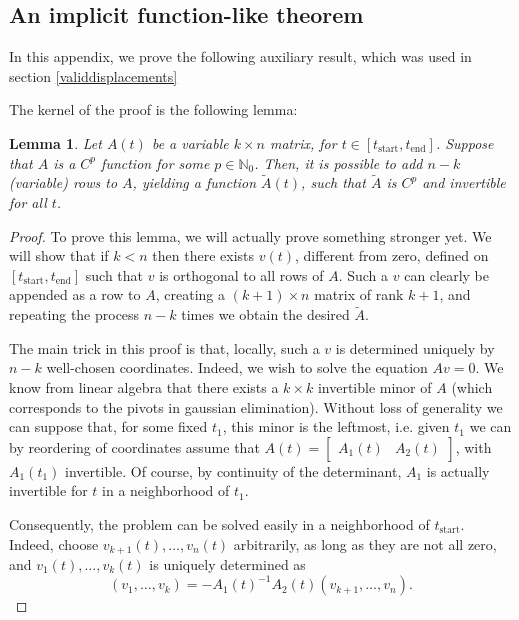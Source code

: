 \documentclass{article}
\theoremstyle{plain}
\newtheorem{lemma}{Lemma}
\theoremstyle{plain}
\theoremstyle{nonumberplain}
\newtheorem{proof}{Proof}
\theoremstyle{empty}
\newcommand{\N}{\mathbb{N}}
\newcommand{\tstart}{\mathrm{start}}
\newcommand{\tend}{\mathrm{end}}
\begin{document}
\begin{appendices}

\section{An implicit function-like theorem}\label{buffift}

In this appendix, we prove the following auxiliary result, which was used in section \ref{validdisplacements}

\buffift*

The kernel of the proof is the following lemma:

\begin{lemma}\label{matrixlemma}
Let $A(t)$ be a variable $k \times n$ matrix, for $t \in [t_\tstart, t_\tend]$. Suppose that $A$ is a $C^p$ function for some $p \in \N_0$. Then, it is possible to add $n-k$ (variable) rows to $A$, yielding a function $\tilde A(t)$, such that $\tilde A$ is $C^p$ and invertible for all $t$.
\end{lemma}

\begin{proof}
To prove this lemma, we will actually prove something stronger yet. We will show that if $k < n$ then there exists $v(t)$, different from zero, defined on $[t_\tstart, t_\tend]$ such that $v$ is orthogonal to all rows of $A$. Such a $v$ can clearly be appended as a row to $A$, creating a $(k+1) \times n$ matrix of rank $k+1$, and repeating the process $n-k$ times we obtain the desired $\tilde A$.

The main trick in this proof is that, locally, such a $v$ is determined uniquely by $n-k$ well-chosen coordinates. Indeed, we wish to solve the equation $A v = 0$. We know from linear algebra that there exists a $k \times k$ invertible minor of $A$ (which corresponds to the pivots in gaussian elimination). Without loss of generality we can suppose that, for some fixed $t_1$, this minor is the leftmost, i.e. given $t_1$ we can by reordering of coordinates assume that $A(t) = \begin{bmatrix} A_1(t) & A_2(t) \end{bmatrix}$, with $A_1(t_1)$ invertible. Of course, by continuity of the determinant, $A_1$ is actually invertible for $t$ in a neighborhood of $t_1$.

Consequently, the problem can be solved easily in a neighborhood of $t_\tstart$. Indeed, choose $v_{k+1}(t), \dots, v_n(t)$ arbitrarily, as long as they are not all zero, and $v_1(t), \dots, v_k(t)$ is uniquely determined as
\[(v_1, \dots, v_k) = - A_1(t)^{-1} A_2(t) (v_{k+1}, \dots, v_n).\]


\end{proof}
\end{appendices}
\end{document}
